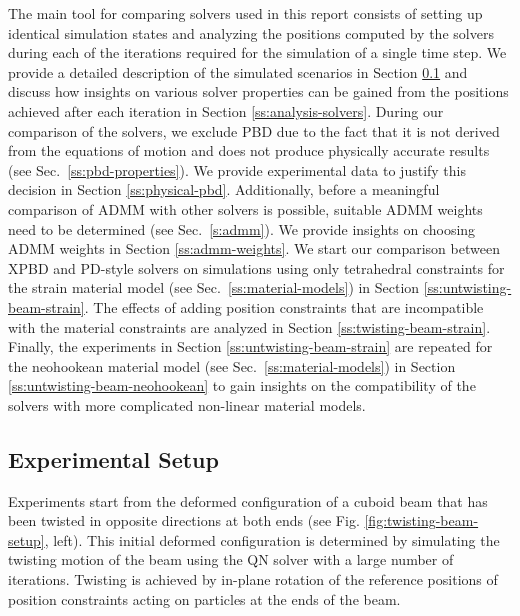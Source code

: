 The main tool for comparing solvers used in this report consists of setting up identical simulation states and analyzing the positions computed by the solvers during 
each of the iterations required for the simulation of a single time step. We provide a detailed description of the simulated scenarios in 
Section \ref{ss:experimental-setup} and discuss how insights on various solver properties can be gained from the positions achieved after each iteration in 
Section \ref{ss:analysis-solvers}. During our comparison of the solvers, we exclude PBD due to the fact that it is not derived from the equations of motion and does not produce 
physically accurate results (see Sec.\ \ref{ss:pbd-properties}). We provide experimental data to justify this decision in Section \ref{ss:physical-pbd}. Additionally, before a meaningful 
comparison of ADMM with other solvers is possible, suitable ADMM weights need to be determined (see Sec.\ \ref{s:admm}). We provide insights on choosing ADMM weights in Section \ref{ss:admm-weights}. 
We start our comparison between XPBD and PD-style solvers on simulations using only tetrahedral constraints for the strain material model (see Sec.\ \ref{ss:material-models}) 
in Section \ref{ss:untwisting-beam-strain}. The effects of adding position constraints that are incompatible with the material constraints are analyzed in 
Section \ref{ss:twisting-beam-strain}. Finally, the experiments in Section \ref{ss:untwisting-beam-strain} are repeated for the neohookean material model (see Sec.\ \ref{ss:material-models}) 
in Section \ref{ss:untwisting-beam-neohookean} to gain insights on the compatibility of the solvers with more complicated non-linear material models.

\subsection{Experimental Setup}\label{ss:experimental-setup}
Experiments start from the deformed configuration of a cuboid beam that has been twisted in opposite directions at both ends (see Fig. \ref{fig:twisting-beam-setup}, left).
This initial deformed configuration is determined by simulating the twisting motion of the beam using the QN solver with a large number 
of iterations. Twisting is achieved by in-plane rotation of the reference positions 
of position constraints acting on particles at the ends of the beam. 

